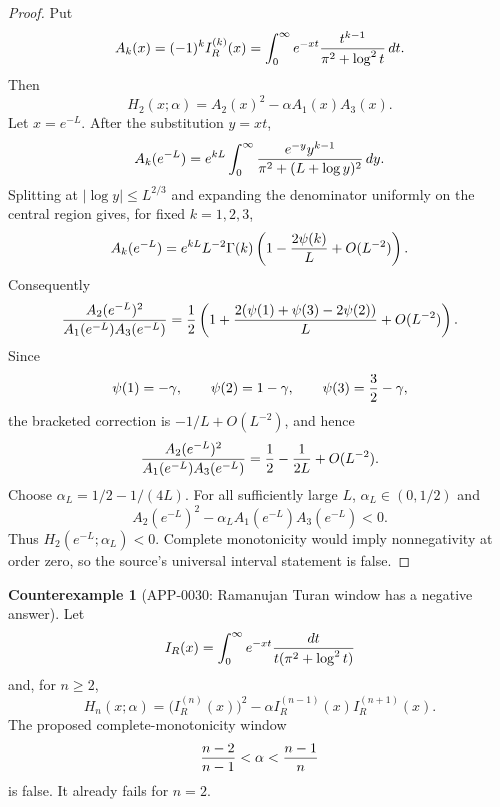 \documentclass[11pt]{article}
\numberwithin{equation}{section}
\theoremstyle{definition}
\newtheorem{counterexample}[theorem]{Counterexample}
\theoremstyle{remark}
\newcommand{\1}{\mathbf 1}
\begin{document}
\begin{proof}
Put
\[
 A_k(x)=(-1)^kI_R^{(k)}(x)
 =\int_0^\infty e^{-xt}{t^{k-1}\over \pi^2+\log^2t}\,dt .
\]
Then
\[
 H_2(x;\alpha)=A_2(x)^2-\alpha A_1(x)A_3(x).
\]
Let \(x=e^{-L}\).  After the substitution \(y=xt\),
\[
 A_k(e^{-L})
 =
 e^{kL}\int_0^\infty
 {e^{-y}y^{k-1}\over \pi^2+(L+\log y)^2}\,dy .
\]
Splitting at \(|\log y|\le L^{2/3}\) and expanding the denominator uniformly
on the central region gives, for fixed \(k=1,2,3\),
\[
 A_k(e^{-L})
 =
 e^{kL}L^{-2}\Gamma(k)
 \left(1-{2\psi(k)\over L}+O(L^{-2})\right).
\]
Consequently
\[
 {A_2(e^{-L})^2\over A_1(e^{-L})A_3(e^{-L})}
 =
 {1\over2}
 \left(
 1+{2(\psi(1)+\psi(3)-2\psi(2))\over L}+O(L^{-2})
 \right).
\]
Since
\[
 \psi(1)=-\gamma,\qquad
 \psi(2)=1-\gamma,\qquad
 \psi(3)={3\over2}-\gamma,
\]
the bracketed correction is \(-1/L+O(L^{-2})\), and hence
\[
 {A_2(e^{-L})^2\over A_1(e^{-L})A_3(e^{-L})}
 =
 {1\over2}-{1\over2L}+O(L^{-2}).
\]
Choose \(\alpha_L=1/2-1/(4L)\).  For all sufficiently large \(L\),
\(\alpha_L\in(0,1/2)\) and
\[
 A_2(e^{-L})^2-\alpha_L A_1(e^{-L})A_3(e^{-L})<0.
\]
Thus \(H_2(e^{-L};\alpha_L)<0\).  Complete monotonicity would imply
nonnegativity at order zero, so the source's universal interval statement is
false.
\end{proof}

\begin{counterexample}[APP-0030: Ramanujan Turan window has a negative answer]
\label{thm:app30-ramanujan-turan}
Let
\[
 I_R(x)=\int_0^\infty e^{-xt}{dt\over t(\pi^2+\log^2t)}
\]
and, for \(n\ge2\),
\[
 H_n(x;\alpha)
 =
 \bigl(I_R^{(n)}(x)\bigr)^2
 -\alpha I_R^{(n-1)}(x)I_R^{(n+1)}(x).
\]
The proposed complete-monotonicity window
\[
 {n-2\over n-1}<\alpha<{n-1\over n}
\]
is false.  It already fails for \(n=2\).


\end{counterexample}
\end{document}
